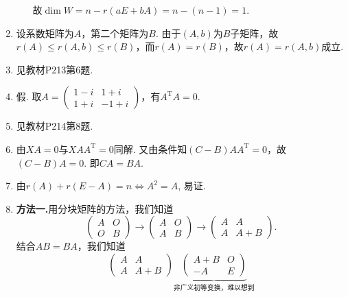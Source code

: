 \begin{enumerate}
\begin{enumerate}
\begin{equation*}
                \end{equation*}
                故$\dim{W}=n-r(aE+bA)=n-(n-1)=1$.
        \end{enumerate}
    \item
        设系数矩阵为$A$，第二个矩阵为$B$. 由于$(A,b)$为$B$子矩阵，故$r(A)\leqslant r(A,b)\leqslant r(B)$，而$r(A)=r(B)$，故$r(A)=r(A,b)$成立.
    \item 见教材P213第6题.
    \item 假. 取$A=\begin{pmatrix}
        1-i & 1+i \\
        1+i & -1+i
    \end{pmatrix}$，有$A^\mathrm{T}A=0$.
    \item 见教材P214第8题.
    \item
        由$XA=0$与$XAA^{\mathrm{T}}=0$同解. 又由条件知$(C-B)AA^\mathrm{T}=0$，故$(C-B)A=0$. 即$CA=BA$.
    \item 由$r(A)+r(E-A)=n \iff A^2=A$, 易证.
    \item
        \textbf{方法一.}用分块矩阵的方法，我们知道
        \begin{equation*}
            \begin{pmatrix}
                A & O \\
                O & B
            \end{pmatrix}
            \rightarrow
            \begin{pmatrix}
                A & O \\
                A & B
            \end{pmatrix}
            \rightarrow
            \begin{pmatrix}
                A & A \\
                A & A+B
            \end{pmatrix}.
        \end{equation*}
        结合$AB=BA$，我们知道
        \begin{equation*}
            \begin{pmatrix}
                A & A \\
                A & A+B
            \end{pmatrix}
            \underbrace{
                \begin{pmatrix}
                    A+B & O \\
                    -A & E
                \end{pmatrix}
            }_{\text{非广义初等变换，难以想到}}

\end{equation*}
\end{enumerate}
